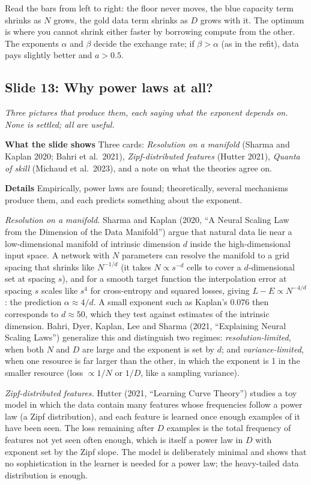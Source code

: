 \documentclass[11pt,letterpaper]{article}
\newcommand{\slide}[3]{%
  \subsection[Slide #1: #2]{Slide #1: #2}%
  {\color{muted}\itshape #3\par}\medskip}
\newcommand{\para}[1]{\medskip\noindent\textbf{#1}\quad}
\newenvironment{intuition}{\begin{tcolorbox}[intuitionbox]}{\end{tcolorbox}}
\begin{document}
\begin{intuition}
Read the bars from left to right: the floor never moves, the blue capacity term shrinks as $N$ grows, the gold data term shrinks as $D$ grows with it. The optimum is where you cannot shrink either faster by borrowing compute from the other. The exponents $\alpha$ and $\beta$ decide the exchange rate; if $\beta>\alpha$ (as in the refit), data pays slightly better and $a>0.5$.
\end{intuition}

\slide{13}{Why power laws at all?}{Three pictures that produce them, each saying what the exponent depends on. None is settled; all are useful.}

\para{What the slide shows} Three cards: \emph{Resolution on a manifold} (Sharma and Kaplan 2020; Bahri et al.\ 2021), \emph{Zipf-distributed features} (Hutter 2021), \emph{Quanta of skill} (Michaud et al.\ 2023), and a note on what the theories agree on.

\para{Details} Empirically, power laws are found; theoretically, several mechanisms produce them, and each predicts something about the exponent.

\emph{Resolution on a manifold.} Sharma and Kaplan (2020, ``A Neural Scaling Law from the Dimension of the Data Manifold'') argue that natural data lie near a low-dimensional manifold of intrinsic dimension $d$ inside the high-dimensional input space. A network with $N$ parameters can resolve the manifold to a grid spacing that shrinks like $N^{-1/d}$ (it takes $N\propto s^{-d}$ cells to cover a $d$-dimensional set at spacing $s$), and for a smooth target function the interpolation error at spacing $s$ scales like $s^{4}$ for cross-entropy and squared losses, giving $L-E\propto N^{-4/d}$: the prediction $\alpha\approx4/d$. A small exponent such as Kaplan's $0.076$ then corresponds to $d\approx50$, which they test against estimates of the intrinsic dimension. Bahri, Dyer, Kaplan, Lee and Sharma (2021, ``Explaining Neural Scaling Laws'') generalize this and distinguish two regimes: \emph{resolution-limited}, when both $N$ and $D$ are large and the exponent is set by $d$; and \emph{variance-limited}, when one resource is far larger than the other, in which the exponent is 1 in the smaller resource (loss $\propto1/N$ or $1/D$, like a sampling variance).

\emph{Zipf-distributed features.} Hutter (2021, ``Learning Curve Theory'') studies a toy model in which the data contain many features whose frequencies follow a power law (a Zipf distribution), and each feature is learned once enough examples of it have been seen. The loss remaining after $D$ examples is the total frequency of features not yet seen often enough, which is itself a power law in $D$ with exponent set by the Zipf slope. The model is deliberately minimal and shows that no sophistication in the learner is needed for a power law; the heavy-tailed data distribution is enough.
\end{document}

